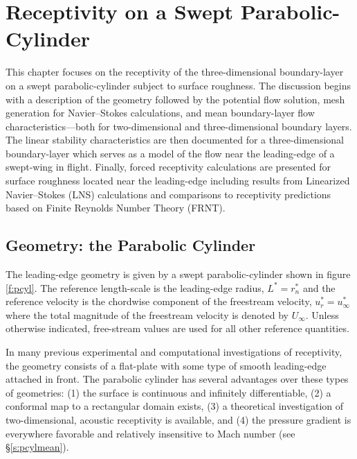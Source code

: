 %
%
%
%
%
\chapter{Receptivity on a Swept Parabolic-Cylinder \label{c:pcyl} }

This chapter focuses on the receptivity of the three-dimensional
boundary-layer on a swept parabolic-cylinder subject to surface roughness.
The discussion begins with a description of the geometry followed by the
potential flow solution, mesh generation for Navier--Stokes calculations, and
mean boundary-layer flow characteristics---both for two-dimensional and
three-dimensional boundary layers.  The linear stability characteristics are
then documented for a three-dimensional boundary-layer which serves as a model
of the flow near the leading-edge of a swept-wing in flight.  Finally, forced
receptivity calculations are presented for surface roughness located near the
leading-edge including results from Linearized Navier--Stokes (LNS)
calculations and comparisons to receptivity predictions based on Finite
Reynolds Number Theory (FRNT).

\section{Geometry: the Parabolic Cylinder}

The leading-edge geometry is given by a swept parabolic-cylinder shown in
figure \ref{f:pcyl}.  The reference length-scale is the leading-edge radius,
$L^*=r_n^*$ and the reference velocity is the chordwise component of the
freestream velocity, $u^*_r = u^*_\infty$ where the total magnitude of the
freestream velocity is denoted by $U_\infty$.  Unless otherwise indicated,
free-stream values are used for all other reference quantities.

In many previous experimental and computational investigations of receptivity,
the geometry consists of a flat-plate with some type of smooth leading-edge
attached in front.  The parabolic cylinder has several advantages over these
types of geometries: (1) the surface is continuous and infinitely
differentiable, (2) a conformal map to a rectangular domain exists, (3) a
theoretical investigation \cite{HaKe:96} of two-dimensional, acoustic
receptivity is available, and (4) the pressure gradient is everywhere
favorable and relatively insensitive to Mach number (see \S\ref{s:pcylmean}).

